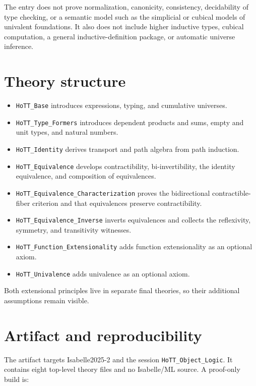 \documentclass[11pt,a4paper]{article}
\begin{document}
The entry does not prove normalization, canonicity, consistency, decidability
of type checking, or a semantic model such as the simplicial
\cite{KapulkinLumsdaine2021} or cubical \cite{BezemCoquandHuber2014} models of
univalent foundations. It also does not include higher inductive types, cubical
computation, a general inductive-definition package, or automatic universe
inference.

\section{Theory structure}

{\sloppy
\begin{itemize}
\item \texttt{HoTT\_Base} introduces expressions, typing, and cumulative
  universes.
\item \texttt{HoTT\_Type\_Formers} introduces dependent products and sums,
  empty and unit types, and natural numbers.
\item \texttt{HoTT\_Identity} derives transport and path algebra from path
  induction.
\item \texttt{HoTT\_Equivalence} develops contractibility, bi-invertibility,
  the identity equivalence, and composition of equivalences.
\item \texttt{HoTT\_Equivalence\_Characterization} proves the bidirectional
  contractible-fiber criterion and that equivalences preserve contractibility.
\item \texttt{HoTT\_Equivalence\_Inverse} inverts equivalences and collects the
  reflexivity, symmetry, and transitivity witnesses.
\item \texttt{HoTT\_Function\_Extensionality} adds function extensionality as
  an optional axiom.
\item \texttt{HoTT\_Univalence} adds univalence as an optional axiom.
\end{itemize}
}

Both extensional principles live in separate final theories, so their
additional assumptions remain visible.

\section{Artifact and reproducibility}

The artifact targets Isabelle2025-2 and the session
\texttt{HoTT\_Object\_Logic}. It contains eight top-level theory files and no
Isabelle/ML source. A proof-only build is:
\end{document}
